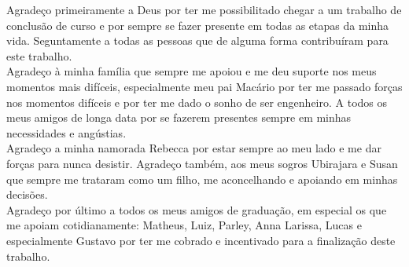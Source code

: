 \begin{agradecimentos}
    Agradeço primeiramente a Deus por ter me possibilitado chegar a um trabalho de conclusão de curso e por sempre se fazer presente em todas as etapas da minha vida. Seguntamente a todas as pessoas que de alguma forma contribuíram para este trabalho. \\
    Agradeço à minha família que sempre me apoiou e me deu suporte nos meus momentos mais difíceis, especialmente meu pai Macário por ter me passado forças nos momentos difíceis e por ter me dado o sonho de ser engenheiro. A todos os meus amigos de longa data por se fazerem presentes sempre em minhas necessidades e angústias. \\
    Agradeço a minha namorada Rebecca por estar sempre ao meu lado e me dar forças para nunca desistir. Agradeço também, aos meus sogros Ubirajara e Susan que sempre me trataram como um filho, me aconcelhando e apoiando em minhas decisões. \\
    Agradeço por último a todos os meus amigos de graduação, em especial os que me apoiam cotidianamente: Matheus, Luiz, Parley, Anna Larissa, Lucas e especialmente Gustavo por ter me cobrado e incentivado para a finalização deste trabalho.
\end{agradecimentos}

